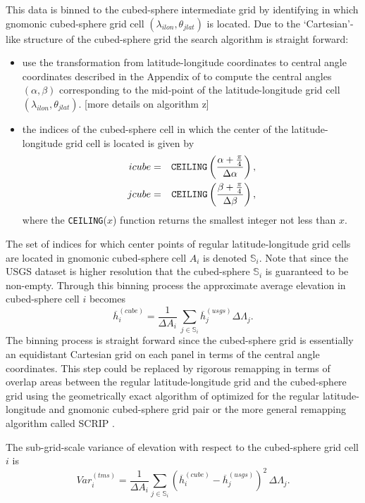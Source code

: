 \documentclass[gmd]{copernicus}
\begin{document}
This data is binned to the cubed-sphere intermediate grid by identifying in  which gnomonic cubed-sphere grid cell $(\lambda_{ilon},\theta_{jlat})$ is located. Due to the `Cartesian'-like structure of the cubed-sphere grid the search algorithm is straight forward:
\begin{itemize}
\item  use the transformation from latitude-longitude coordinates to central angle coordinates described in the Appendix of \cite{NTL2005MWRb} to compute the central angles $(\alpha, \beta)$ corresponding to the mid-point of the latitude-longitude grid cell $(\lambda_{ilon},\theta_{jlat})$.  [more details on algorithm z]
\item the indices of the cubed-sphere cell in which the center of the latitude-longitude grid cell is located is given by  
\begin{eqnarray*} 
icube &=& \verb+CEILING+\left(\frac{\alpha + \frac{\pi}{4}}{\Delta \alpha}\right),\\
jcube &=& \verb+CEILING+\left(\frac{\beta  + \frac{\pi}{4}}{\Delta \beta}\right),
\end{eqnarray*}
where the \verb+CEILING+($x$) function returns the smallest integer not less than $x$. 
\end{itemize}
The set of indices for which center points of regular latitude-longitude grid cells are located in gnomonic cubed-sphere cell $A_i$ is denoted ${\mathbb{S}}_i$. Note that since the USGS dataset is higher resolution that the cubed-sphere ${\mathbb{S}}_i$ is guaranteed to be non-empty. Through this binning process the approximate average elevation in cubed-sphere cell $i$ becomes
\begin{equation}
\overline{h}^{(cube)}_i=\frac{1}{\Delta A_i}\, \sum_{j\in {\mathbb{S}}_i}{\overline{h}}^{(usgs)}_j\Delta \Lambda_j.
\end{equation}
The binning process is straight forward since the cubed-sphere grid is essentially an equidistant Cartesian grid on each panel in terms of the central angle coordinates. This step could be replaced by rigorous remapping in terms of overlap areas between the regular latitude-longitude grid and the cubed-sphere grid using the geometrically exact algorithm of \citep{ULJ2009MWR} optimized for the regular latitude-longitude and gnomonic cubed-sphere grid pair or the more general remapping algorithm called SCRIP \citep{J1999MWR}.

The sub-grid-scale variance of elevation with respect to the cubed-sphere grid cell $i$ is
\begin{equation}
Var^{(tms)}_i=\frac{1}{\Delta A_i}\sum_{j\in {\mathbb{S}}_i} \left( \overline{h}_i^{(cube)}-{\overline{h}}^{(usgs)}_j\right)^2\, \Delta \Lambda_j.
\end{equation}
\end{document}
